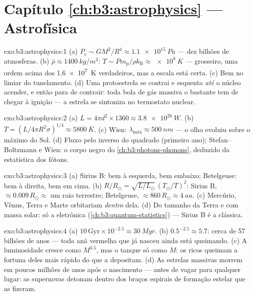 \section*{Capítulo \ref{ch:b3:astrophysics} --- Astrofísica}

\begin{solution}{exo:b3:astrophysics:1}
(a) $P_{\text{c}} \sim GM^2/R^4 \approx \qty{1.1e15}{Pa}$ --- dez
bilhões de atmosferas. (b) $\bar\rho \approx \qty{1400}{kg/m^3}$:
$T \sim P m_{\text{p}}/\rho k_{\text{B}} \approx \qty{e8}{K}$ ---
grosseiro, uma ordem acima dos \qty{1.6e7}{K} verdadeiros, mas a escala
está certa. (c) Bem no limiar do tunelamento. (d) Uma protoestrela
se contrai e esquenta \emph{até} o núcleo acender, e então para de
contrair: toda bola de gás massiva o bastante tem de chegar à ignição
--- a estrela se sintoniza no termostato nuclear.
\end{solution}

\begin{solution}{exo:b3:astrophysics:2}
(a) $L = 4\pi d^2\times1360 \approx \qty{3.8e26}{W}$. (b) $T =
(L/4\pi R^2\sigma)^{1/4} \approx \qty{5800}{K}$. (c) Wien:
$\lambda_{\text{máx}} \approx \qty{500}{nm}$ --- o olho evoluiu
sobre o máximo do Sol. (d) Fluxo pelo inverso do quadrado (primeiro ano);
Stefan--Boltzmann e Wien: o corpo negro do
\cref{ch:b3:photons-phonons}, deduzido da estatística dos fótons.
\end{solution}

\begin{solution}{exo:b3:astrophysics:3}
(a) Sirius B: bem à esquerda, bem embaixo; Betelgeuse: bem à direita,
bem em cima.
(b) $R/R_\odot = \sqrt{L/L_\odot}\,(T_\odot/T)^2$: Sirius B,
$\approx 0.009\,R_\odot \approx$ um raio terrestre; Betelgeuse,
$\approx 860\,R_\odot \approx \qty{4}{au}$. (c) Mercúrio, Vênus,
Terra e Marte orbitariam \emph{dentro} dela. (d) Do tamanho da Terra e
com massa solar: só a  eletrônica
(\cref{ch:b3:quantum-statistics}) --- Sirius B é a 
clássica.
\end{solution}

\begin{solution}{exo:b3:astrophysics:4}
(a) $10\,\text{Gyr}\times10^{-2.5} \approx \qty{30}{Myr}$. (b)
$0.5^{-2.5} \approx 5.7$: cerca de 57 bilhões de anos --- toda anã
vermelha que já nasceu ainda está queimando. (c) A luminosidade cresce
como $M^{3.5}$, mas o tanque só como $M$: os ricos queimam a fortuna
deles mais rápido do que a depositam. (d) As estrelas massivas morrem em
poucos milhões de anos após o nascimento --- antes de vagar para qualquer
lugar: as supernovas detonam dentro dos braços espirais de formação
estelar que as fizeram.
\end{solution}

